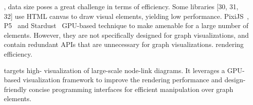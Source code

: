 , data size poses a great challenge in terms of efficiency. Some libraries [30, 31, 32] use HTML canvas to draw visual elements, yielding  low performance. PixiJS~\cite{graphicslearn}, P5~\cite{DBLP:journals/tvcg/LiM20}\added[id=kg]{,} and Stardust~\cite{DBLP:journals/cgf/RenLH17}  GPU-based technique to make  amenable for a large number of elements. However, they are not specifically designed for graph visualizations, and contain redundant APIs that are unnecessary for graph visualizations.  rendering efficiency. 

\name targets  high- visualization of large-scale node-link diagrams. It leverages a GPU-based visualization framework to improve the rendering performance\deleted[id=kg]{,} and design-friendly concise programming interfaces for efficient manipulation over graph elements.



